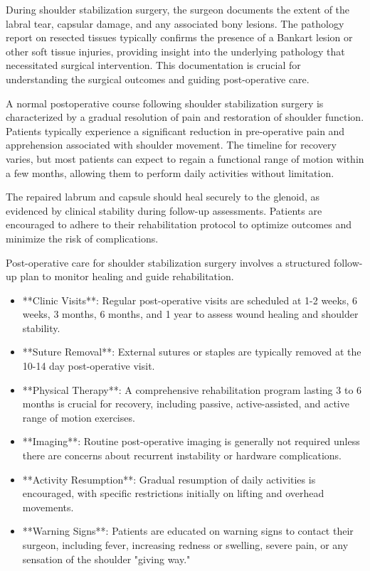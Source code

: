During shoulder stabilization surgery, the surgeon documents the extent of the labral tear, capsular damage, and any associated bony lesions. The pathology report on resected tissues typically confirms the presence of a Bankart lesion or other soft tissue injuries, providing insight into the underlying pathology that necessitated surgical intervention. This documentation is crucial for understanding the surgical outcomes and guiding post-operative care.

A normal postoperative course following shoulder stabilization surgery is characterized by a gradual resolution of pain and restoration of shoulder function. Patients typically experience a significant reduction in pre-operative pain and apprehension associated with shoulder movement. The timeline for recovery varies, but most patients can expect to regain a functional range of motion within a few months, allowing them to perform daily activities without limitation. 

The repaired labrum and capsule should heal securely to the glenoid, as evidenced by clinical stability during follow-up assessments. Patients are encouraged to adhere to their rehabilitation protocol to optimize outcomes and minimize the risk of complications.

Post-operative care for shoulder stabilization surgery involves a structured follow-up plan to monitor healing and guide rehabilitation.

\begin{itemize}
  \item **Clinic Visits**: Regular post-operative visits are scheduled at 1-2 weeks, 6 weeks, 3 months, 6 months, and 1 year to assess wound healing and shoulder stability.
  \item **Suture Removal**: External sutures or staples are typically removed at the 10-14 day post-operative visit.
  \item **Physical Therapy**: A comprehensive rehabilitation program lasting 3 to 6 months is crucial for recovery, including passive, active-assisted, and active range of motion exercises.
  \item **Imaging**: Routine post-operative imaging is generally not required unless there are concerns about recurrent instability or hardware complications.
  \item **Activity Resumption**: Gradual resumption of daily activities is encouraged, with specific restrictions initially on lifting and overhead movements.
  \item **Warning Signs**: Patients are educated on warning signs to contact their surgeon, including fever, increasing redness or swelling, severe pain, or any sensation of the shoulder "giving way."
\end{itemize}

